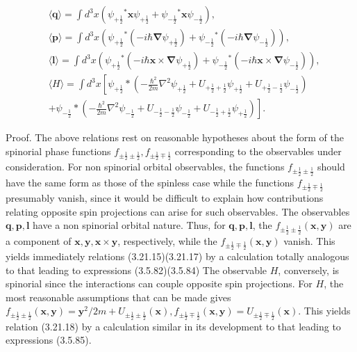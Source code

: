 \documentclass{article}
\begin{document}
\begin{align*}
& \langle\boldsymbol{q}\rangle=\int d^{3} x\left(\psi_{+\frac{1}{2}}{ }^{*} \boldsymbol{x} \psi_{+\frac{1}{2}}+\psi_{-\frac{1}{2}}{ }^{*} \boldsymbol{x} \psi_{-\frac{1}{2}}\right),  \tag{3.21.15}\\
& \langle\boldsymbol{p}\rangle=\int d^{3} x\left({\psi_{+\frac{1}{2}}}^{*}\left(-i \hbar \boldsymbol{\nabla} \psi_{+\frac{1}{2}}\right)+\psi_{-\frac{1}{2}}{ }^{*}\left(-i \hbar \boldsymbol{\nabla} \psi_{-\frac{1}{2}}\right)\right),  \tag{3.21.16}\\
& \langle\boldsymbol{l}\rangle=\int d^{3} x\left(\psi_{+\frac{1}{2}}{ }^{*}\left(-i \hbar \boldsymbol{x} \times \boldsymbol{\nabla} \psi_{+\frac{1}{2}}\right)+\psi_{-\frac{1}{2}}{ }^{*}\left(-i \hbar \boldsymbol{x} \times \boldsymbol{\nabla} \psi_{-\frac{1}{2}}\right)\right),  \tag{3.21.17}\\
& \langle H\rangle=\int d^{3} x\left[\psi_{+\frac{1}{2}} *\left(-\frac{\hbar^{2}}{2 m} \nabla^{2} \psi_{+\frac{1}{2}}+U_{+\frac{1}{2}+\frac{1}{2}} \psi_{+\frac{1}{2}}+U_{+\frac{1}{2}-\frac{1}{2}} \psi_{-\frac{1}{2}}\right)\right.  \tag{3.21.18}\\
& \left.+\psi_{-\frac{1}{2}} *\left(-\frac{\hbar^{2}}{2 m} \nabla^{2} \psi_{-\frac{1}{2}}+U_{-\frac{1}{2}-\frac{1}{2}} \psi_{-\frac{1}{2}}+U_{-\frac{1}{2}+\frac{1}{2}} \psi_{+\frac{1}{2}}\right)\right] .
\end{align*}
 

Proof. The above relations rest on reasonable hypotheses about the form of the spinorial phase functions $f_{ \pm \frac{1}{2} \pm \frac{1}{2}}, f_{ \pm \frac{1}{2} \mp \frac{1}{2}}$ corresponding to the observables under consideration. For non spinorial orbital observables, the functions $f_{ \pm \frac{1}{2} \pm \frac{1}{2}}$ should have the
same form as those of the spinless case while the functions $f_{ \pm \frac{1}{2} \mp \frac{1}{2}}$ presumably vanish, since it would be difficult to explain how contributions relating opposite spin projections can arise for such observables. The observables $\boldsymbol{q}, \boldsymbol{p}, \boldsymbol{l}$ have a non spinorial orbital nature. Thus, for $\boldsymbol{q}, \boldsymbol{p}, \boldsymbol{l}$, the $f_{ \pm \frac{1}{2} \pm \frac{1}{2}}(\boldsymbol{x}, \boldsymbol{y})$ are a component of $\boldsymbol{x}, \boldsymbol{y}, \boldsymbol{x} \times \boldsymbol{y}$, respectively, while the $f_{ \pm \frac{1}{2} \mp \frac{1}{2}}(\boldsymbol{x}, \boldsymbol{y})$ vanish. This yields immediately relations (3.21.15)(3.21.17) by a calculation totally analogous to that leading to expressions (3.5.82)(3.5.84) The observable $H$, conversely, is spinorial since the interactions can couple opposite spin projections. For $H$, the most reasonable assumptions that can be made gives $f_{ \pm \frac{1}{2} \pm \frac{1}{2}}(\boldsymbol{x}, \boldsymbol{y})=\boldsymbol{y}^{2} / 2 m+U_{ \pm \frac{1}{2} \pm \frac{1}{2}}(\boldsymbol{x}), f_{ \pm \frac{1}{2} \mp \frac{1}{2}}(\boldsymbol{x}, \boldsymbol{y})=U_{ \pm \frac{1}{2} \mp \frac{1}{2}}(\boldsymbol{x})$. This yields relation (3.21.18) by a calculation similar in its development to that leading to expressions (3.5.85).
\end{document}

